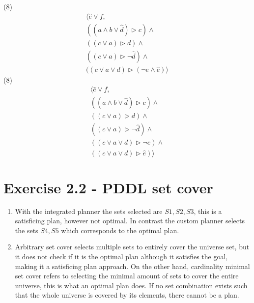 \documentclass[12pt,a4paper]{article}
\begin{document}
\begin{multicols}{2}
	(8)
	\begin{align*} 
		\langle \hat{e} \lor f, 
		\\ ((a \land b \lor \hat{d}) \triangleright c) \land 
		\\ ((c \lor a) \triangleright d) \land 
		\\ ((c \lor a) \triangleright \neg\hat{d}) \land 
		\\ ((c \lor a \lor d) \triangleright (\neg{e} \land \hat{e}) \rangle
	\end{align*} 
	(8)
	\begin{align*} 
		\langle \hat{e} \lor f, 
		\\ ((a \land b \lor \hat{d}) \triangleright c) \land 
		\\ ((c \lor a) \triangleright d) \land 
		\\ ((c \lor a) \triangleright \neg\hat{d}) \land 
		\\ ((c \lor a \lor d) \triangleright \neg{e}) \land 
		\\ ((c \lor a \lor d) \triangleright \hat{e}) \rangle
	\end{align*} 
\end{multicols}

\section{Exercise 2.2 - PDDL set cover}

\begin{enumerate}[label=\alph*.,start=3]
	\item With the integrated planner the sets selected are $S1, S2, S3$, 
		this is a satisficing plan, however not optimal. In contrast the 
		custom planner selects the sets $S4,S5$ which corresponds to the optimal plan.
	\item Arbitrary set cover selects multiple sets to entirely cover the universe set, 
		but it does not check if it is the optimal plan although it satisfies the goal,
		making it a satisficing plan approach. On the other hand, cardinality minimal set cover
		refers to selecting the minimal amount of sets to cover the entire universe,
		this is what an optimal plan does. If no set combination exists such that the 
		whole universe is covered by its elements, there cannot be a plan.
\end{enumerate}
\end{document}
